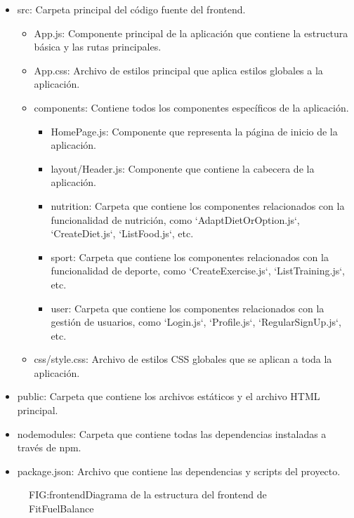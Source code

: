 \begin{itemize}
  \item src: Carpeta principal del código fuente del frontend.
    \begin{itemize}
      \item App.js: Componente principal de la aplicación que contiene la estructura básica y las rutas principales.
      \item App.css: Archivo de estilos principal que aplica estilos globales a la aplicación.
      \item components: Contiene todos los componentes específicos de la aplicación.
        \begin{itemize}
          \item HomePage.js: Componente que representa la página de inicio de la aplicación.
          \item layout/Header.js: Componente que contiene la cabecera de la aplicación.
          \item nutrition: Carpeta que contiene los componentes relacionados con la funcionalidad de nutrición, como `AdaptDietOrOption.js`, `CreateDiet.js`, `ListFood.js`, etc.
          \item sport: Carpeta que contiene los componentes relacionados con la funcionalidad de deporte, como `CreateExercise.js`, `ListTraining.js`, etc.
          \item user: Carpeta que contiene los componentes relacionados con la gestión de usuarios, como `Login.js`, `Profile.js`, `RegularSignUp.js`, etc.
        \end{itemize}
      \item css/style.css: Archivo de estilos CSS globales que se aplican a toda la aplicación.
    \end{itemize}
  \item public: Carpeta que contiene los archivos estáticos y el archivo HTML principal.
  \item nodemodules: Carpeta que contiene todas las dependencias instaladas a través de npm.
  \item package.json: Archivo que contiene las dependencias y scripts del proyecto.
\end{itemize}

\begin{figure}[Diagrama de la estructura del frontend]{FIG:frontend}{Diagrama de la estructura del frontend de FitFuelBalance}
\end{figure}
\newpage

